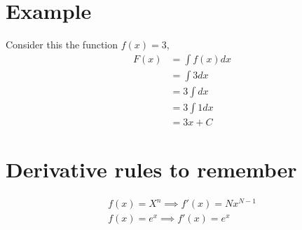 \documentclass{article}
\begin{document}
\section{Example }

Consider this the function $f(x) = 3$, 
\begin{align}
    F(x) &= \int f(x) dx\\
    &=  \int 3 dx\\
    &= 3 \int dx \\
    &= 3 \int 1 dx\\
    &= 3x + C
\end{align}

\section{Derivative rules to remember}

\begin{align}
    f(x) = X^n \implies f'(x) = Nx^{N - 1}\\
    f(x) = e^x \implies f'(x) = e^x
\end{align}
\end{document}
